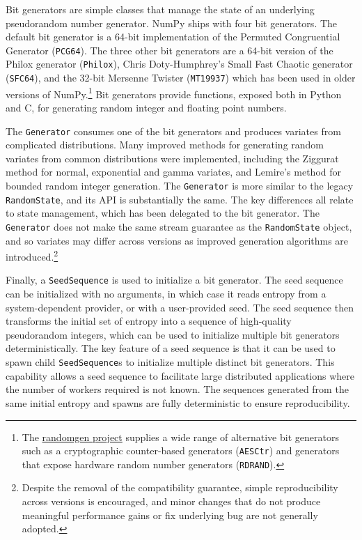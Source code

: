 Bit generators are simple classes that manage the state of an underlying
pseudorandom number generator. NumPy ships with four bit generators. The default
bit generator is a 64-bit implementation of the Permuted Congruential Generator
\cite{pcg64} (\texttt{PCG64}). The three other bit generators are a 64-bit version
of the Philox generator\cite{random123} (\texttt{Philox}), Chris Doty-Humphrey's
Small Fast Chaotic generator\cite{practrand} (\texttt{SFC64}), and the 32-bit
Mersenne Twister\cite{mt19937} (\texttt{MT19937}) which has been used in older
versions of NumPy.\footnote{The
\href{https://github.com/bashtage/randomgen}{randomgen project} supplies a wide
range of alternative bit generators such as a cryptographic counter-based
generators (\texttt{AESCtr}) and generators that expose hardware random number
generators (\texttt{RDRAND})\cite{randomgen}.} Bit generators provide
functions, exposed both in Python and C, for generating random integer
and floating point numbers.

The \texttt{Generator} consumes one of the bit generators and produces variates
from complicated distributions. Many improved methods for generating random
variates from common distributions were implemented, including the Ziggurat
method for normal, exponential and gamma variates\cite{ziggurat}, and Lemire's
method for bounded random integer generation\cite{lemire}. The \texttt{Generator}
is more similar to the legacy \texttt{RandomState}, and its API is substantially
the same. The key differences all relate to state management, which has been
delegated to the bit generator. The \texttt{Generator} does not make the same
stream guarantee as the \texttt{RandomState} object, and so variates may differ
across versions as improved generation algorithms are
introduced.\footnote{Despite the removal of the compatibility guarantee, simple
reproducibility across versions is encouraged, and minor changes that do not
produce meaningful performance gains or fix underlying bug are not generally
adopted.}

Finally, a \texttt{SeedSequence} is used to initialize a bit generator. The seed
sequence can be initialized with no arguments, in which case it reads entropy
from a system-dependent provider, or with a user-provided seed. The seed
sequence then transforms the initial set of entropy into a sequence of
high-quality pseudorandom integers, which can be used to initialize multiple bit
generators deterministically. The key feature of a seed sequence is that
it can be used to spawn child \texttt{SeedSequence}s to initialize
multiple distinct bit generators.
This capability allows a seed sequence to facilitate large distributed applications
where the number of workers required is not known. The sequences generated from
the same initial entropy and spawns are fully deterministic to ensure
reproducibility.

